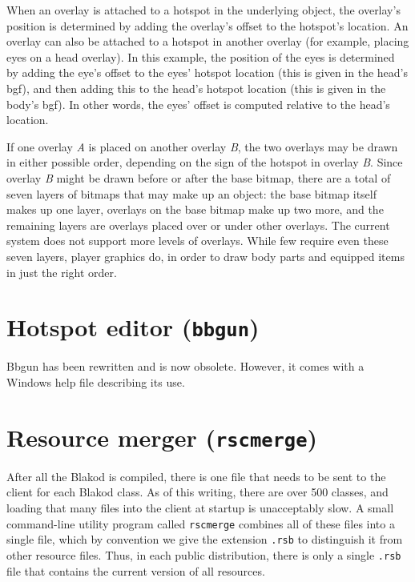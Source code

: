 When an overlay is attached to a hotspot in the underlying object, the
overlay's position is determined by adding the overlay's offset to the
hotspot's location.  An overlay can also be attached to a hotspot in
another overlay (for example, placing eyes on a head overlay).  In
this example, the position of the eyes is determined by adding the
eye's offset to the eyes' hotspot location (this is given in the
head's bgf), and then adding this to the head's hotspot location (this
is given in the body's bgf).  In other words, the eyes' offset is
computed relative to the head's location.

If one overlay {\em A} is placed on another overlay {\em B}, the two
overlays may be drawn in either possible order, depending on the sign
of the hotspot in overlay {\em B}.  Since overlay {\em B} might be
drawn before or after the base bitmap, there are a total of seven
layers of bitmaps that may make up an object: the base bitmap itself
makes up one layer, overlays on the base bitmap make up two more, and
the remaining layers are overlays placed over or under other overlays.
The current system does not support more levels of overlays.  While
few require even these seven layers, player graphics do, in order to
draw body parts and equipped items in just the right order.

\section{Hotspot editor ({\tt bbgun})}

Bbgun has been rewritten and is now obsolete. However, it comes with a
Windows help file describing its use.

\section{Resource merger ({\tt rscmerge})}

After all the Blakod is compiled, there is one \rsc file that needs to
be sent to the client for each Blakod class.  As of this writing,
there are over 500 classes, and loading that many \rsc files into the
client at startup is unacceptably slow.  A small command-line utility
program called {\tt rscmerge} combines all of these \rsc files into a
single file, which by convention we give the extension {\tt .rsb} to
distinguish it from other resource files.  Thus, in each public
distribution, there is only a single {\tt .rsb} file that contains the
current version of all resources.

